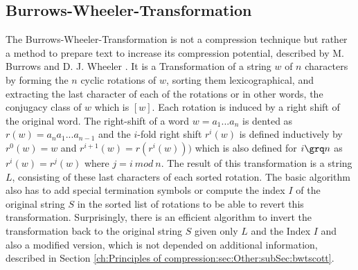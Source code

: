 \subsection{Burrows-Wheeler-Transformation}
\label{ch:Principles of compression:sec:Other:subSec:bwt}

\par{
The Burrows-Wheeler-Transformation is not a compression technique but rather a method to prepare text to increase its compression potential, described by M. Burrows and D. J. Wheeler \cite{Burrows94}. It is a Transformation of a string $w$ of $n$ characters by forming the $n$ cyclic rotations of $w$, sorting them lexicographical, and extracting the last character of each of the rotations or in other words, the conjugacy class of $w$ which is $[w]$. Each rotation is induced by a right shift of the original word. The right-shift of a word $w=a_1 ... a_n$ is dented as $r(w) = a_na_1...a_{n-1}$ and the $i$-fold right shift $r^i(w)$ is defined inductively by $r^0(w) = w$ and $r^{i+1}(w) = r(r^i(w))) $ which is also defined for $i \grq n$ as $r^i(w)=r^j(w)$ where $j = i \: mod \: n$. The result of this transformation is a string $L$, consisting of these last characters of each sorted rotation. The basic algorithm also has to add special termination symbols or compute the index $I$ of the original string $S$ in the sorted list of rotations to be able to revert this transformation. Surprisingly, there is an efficient algorithm to invert the transformation back to the original string $S$ given only $L$ and the Index $I$ \cite{Burrows-linear-time} and also a modified version, which is not depended on additional information, described in Section \ref{ch:Principles of compression:sec:Other:subSec:bwtscott}.
}

